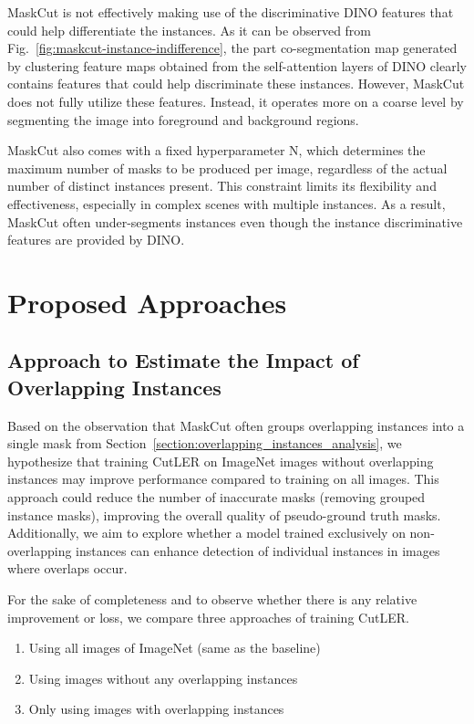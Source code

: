MaskCut is not effectively making use of the discriminative DINO features that could help differentiate the instances. As it can be observed from Fig.~\ref{fig:maskcut-instance-indifference}, the part co-segmentation map generated by clustering feature maps obtained from the self-attention layers of DINO clearly contains features that could help discriminate these instances. However, MaskCut does not fully utilize these features. Instead, it operates more on a coarse level by segmenting the image into foreground and background regions.

MaskCut also comes with a fixed hyperparameter N, which determines the maximum number of masks to be produced per image, regardless of the actual number of distinct instances present. This constraint limits its flexibility and effectiveness, especially in complex scenes with multiple instances. As a result, MaskCut often under-segments instances even though the instance discriminative features are provided by DINO.

\section{Proposed Approaches}

\subsection{Approach to Estimate the Impact of Overlapping Instances}
\label{section:analysis_ol_instancs}

Based on the observation that MaskCut often groups overlapping instances into a single mask from Section~\ref{section:overlapping_instances_analysis}, we hypothesize that training CutLER on ImageNet images without overlapping instances may improve performance compared to training on all images. This approach could reduce the number of inaccurate masks (removing grouped instance masks), improving the overall quality of pseudo-ground truth masks. Additionally, we aim to explore whether a model trained exclusively on non-overlapping instances can enhance detection of individual instances in images where overlaps occur.

For the sake of completeness and to observe whether there is any relative improvement or loss, we compare three approaches of training CutLER. 

\begin{enumerate}
	\item Using all images of ImageNet (same as the baseline)
	\item Using images without any overlapping instances 
	\item Only using images with overlapping instances
\end{enumerate}

